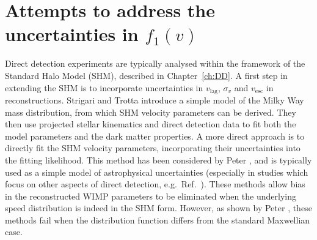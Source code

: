 

\section{Attempts to address the uncertainties in $f_1(v)$}
\label{sec:Speed:attempts}

Direct detection experiments are typically analysed within the framework of the Standard Halo Model (SHM), described in Chapter~\ref{ch:DD}. A first step in extending the SHM is to incorporate uncertainties in $v_\textrm{lag}$, $\sigma_v$ and $v_\textrm{esc}$ in reconstructions. Strigari and Trotta \cite{Strigari:2009} introduce a simple model of the Milky Way mass distribution, from which SHM velocity parameters can be derived. They then use projected stellar kinematics and direct detection data to fit both the model parameters and the dark matter properties. A more direct approach is to directly fit the SHM velocity parameters, incorporating their uncertainties into the fitting likelihood. This method has been considered by Peter \cite{Peter:2010}, and is typically used as a simple model of astrophysical uncertainties (especially in studies which focus on other aspects of direct detection, e.g.\ Ref.~\cite{Arina:2013}). These methods allow bias in the reconstructed WIMP parameters to be eliminated when the underlying speed distribution is indeed in the SHM form. However, as shown by Peter \cite{Peter:2011}, these methods fail when the distribution function differs from the standard Maxwellian case.

